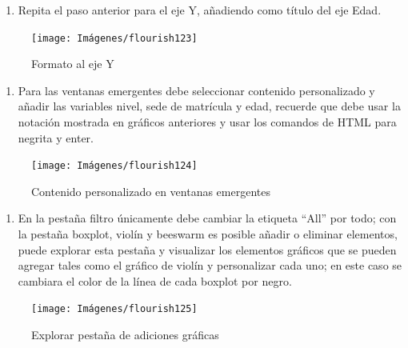 \documentclass[
]{book}
\providecommand{\tightlist}{%
  \setlength{\itemsep}{0pt}\setlength{\parskip}{0pt}}
\begin{document}
\begin{enumerate}
\def\labelenumi{\arabic{enumi}.}
\setcounter{enumi}{4}
\tightlist
\item
  Repita el paso anterior para el eje Y, añadiendo como título del eje Edad.
\end{enumerate}

\begin{figure}

{\centering \texttt{[image: Imágenes/flourish123]} 

}

\caption{Formato al eje Y}\label{fig:paso5boxplotflourish-fig}
\end{figure}

\begin{enumerate}
\def\labelenumi{\arabic{enumi}.}
\setcounter{enumi}{5}
\tightlist
\item
  Para las ventanas emergentes debe seleccionar contenido personalizado y añadir las variables nivel, sede de matrícula y edad, recuerde que debe usar la notación mostrada en gráficos anteriores y usar los comandos de HTML para negrita y enter.
\end{enumerate}

\begin{figure}

{\centering \texttt{[image: Imágenes/flourish124]} 

}

\caption{Contenido personalizado en ventanas emergentes}\label{fig:paso6boxplotflourish-fig}
\end{figure}

\begin{enumerate}
\def\labelenumi{\arabic{enumi}.}
\setcounter{enumi}{6}
\tightlist
\item
  En la pestaña filtro únicamente debe cambiar la etiqueta ``All'' por todo; con la pestaña boxplot, violín y beeswarm es posible añadir o eliminar elementos, puede explorar esta pestaña y visualizar los elementos gráficos que se pueden agregar tales como el gráfico de violín y personalizar cada uno; en este caso se cambiara el color de la línea de cada boxplot por negro.
\end{enumerate}

\begin{figure}

{\centering \texttt{[image: Imágenes/flourish125]} 

}

\caption{Explorar pestaña de adiciones gráficas}\label{fig:paso7boxplotflourish-fig}
\end{figure}
\end{document}
